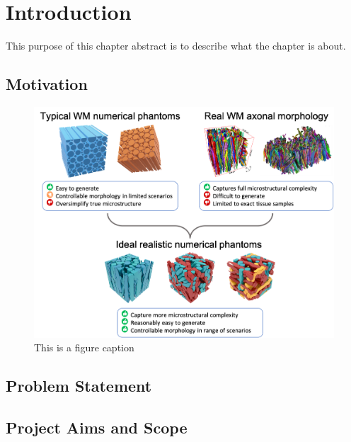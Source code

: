 \renewcommand{\LifeChapter}{y}
\chapter{Introduction}
\label{chap:introduction}

\chaptertoc{}

\begin{chapterabstract}
  This purpose of this chapter abstract is to describe what the chapter is about.
\end{chapterabstract}

\section{Motivation}
\label{sec:intro_motivation}
\Blindtext

\begin{figure}
  \centering
  \includegraphics[width=\textwidth]{figures/introduction/overview}
  \caption[Overview of the main goal of the thesis]{This is a figure caption}
  \label{fig:intro_overview}
\end{figure}

\section{Problem Statement}
\label{sec:intro_problem_statement}
\blindtext


\section{Project Aims and Scope}
\label{sec:intro_project_aims}
\blindtext

